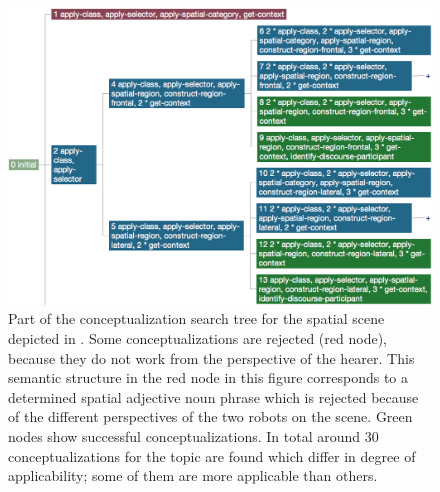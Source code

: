 \begin{figure}
\begin{centering}
\includegraphics[width=1\columnwidth]{figs/conceptualization.png}
\end{centering}
\caption[Example search tree for conceptualization of a spatial scene.]
{Part of the conceptualization search tree for the spatial scene depicted
in .
Some conceptualizations are rejected (red node), because they do not work
from the perspective of the hearer. This semantic structure in the red node 
in this figure corresponds to a determined spatial adjective noun phrase 
which is rejected because of the different
perspectives of the two robots on the scene. Green nodes 
show successful conceptualizations. In total around 30 conceptualizations 
for the topic are found which differ in degree of
applicability; some of them are more applicable than others.}
\label{f:conceptualization-search}
\end{figure}

